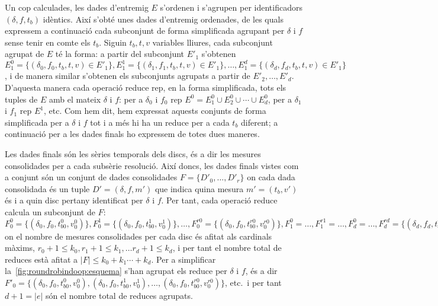 Un cop calculades, les dades d'entremig $E$ s'ordenen i
s'agrupen per identificadors $(\delta,f, t_b)$ idèntics.  Així s'obté
unes dades d'entremig ordenades, de les quals expressem a continuació
cada subconjunt de forma simplificada agrupant per $\delta$ i $f$
sense tenir en comte els $t_b$. Siguin $ t_b, t,v$ variables lliures,
cada subconjunt agrupat de $E$ té la forma:
a partir del subconjunt $E'_1$ s'obtenen $E_1^0=\{ (\delta_0,f_0, t_b,
t,v) \in E'_1 \}, E_1^1=\{ (\delta_1,f_1, t_b, t,v) \in E'_1 \},
\dotsc, E_1^d=\{ (\delta_d,f_d, t_b, t,v) \in E'_1 \}$, i de manera
similar s'obtenen els subconjunts agrupats a partir de
$E'_2,\dotsc,E'_d$.  D'aquesta manera cada operació reduce rep, en la
forma simplificada, tots els tuples de $E$ amb el mateix $\delta$ i
$f$: per a $\delta_0$ i $f_0$ rep $E^0 = E_1^0 \cup E_2^0 \cup \dotsb
\cup E_d^0$, per a $\delta_1$ i $f_1$ rep $E^1$, etc.  Com hem dit,
hem expressat aquests conjunts de forma simplificada per a $\delta$ i
$f$ tot i a més hi ha un reduce per a cada $t_b$ diferent; a
continuació per a les dades finals ho expressem de totes dues maneres.



Les dades finals són les sèries temporals dels discs, és a dir les
mesures consolidades per a cada subsèrie resolució. Així doncs, les
dades finals vistes com a conjunt són un conjunt de dades consolidades
$F=\{ D'_{0}, \dotsc, D'_r\}$ on cada dada consolidada és un tuple
$D'=(\delta,f,m')$ que indica quina mesura $m'=(t_b,v')$ és i a quin
disc pertany identificat per $\delta$ i $f$.  Per tant, cada operació
reduce calcula un subconjunt de $F$: $F_0^0
=\{(\delta_0,f_0,t_{b0}^0,v_0^0)\}, F_0^1
=\{(\delta_0,f_0,t_{b0}^1,v_0^1)\}, \dotsc, F_0^{r0}
=\{(\delta_0,f_0,t_{b0}^{r0},v_0^{r0})\}, F_1^0= \dotsc, F_1^{r1}=
\dotsc, F_d^0= \dotsc, F_d^{rd}=
\{(\delta_d,f_d,t_{bd}^{rd},v_d^{rd})\}$ on el nombre de mesures
consolidades per cada disc és afitat als cardinals màxims, $r_0 +1
\leq k_0, r_1 +1 \leq k_1, \dotsc r_d +1 \leq k_d$, i per tant el
nombre total de reduces està afitat a $|F| \leq k_0+k_1\dotsb+k_d$.
Per a simplificar la~\autoref{fig:roundrobindoop:esquema} s'han
agrupat els reduce per $\delta$ i $f$, és a dir $F'_0 =
\{(\delta_0,f_0,t_{b0}^0,v_0^0),(\delta_0,f_0,t_{b0}^1,v_0^1),\dotsc,
(\delta_0,f_0,t_{b0}^{r0},v_0^{r0})\}$, etc.\ i per tant $d+1= |e|$
són el nombre total de reduces agrupats.



